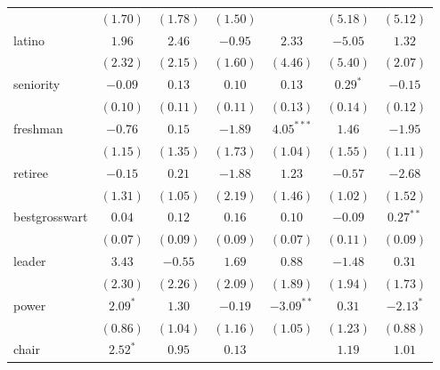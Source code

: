 \documentclass[12pt]{article}
\begin{document}
\begin{table}
\begin{center}
\begin{tabular}{l c c c c c c }
            & $(1.70)$     & $(1.78)$      & $(1.50)$       &              & $(5.18)$       & $(5.12)$      \\
            latino                 & $1.96$       & $2.46$        & $-0.95$        & $2.33$       & $-5.05$        & $1.32$        \\
            & $(2.32)$     & $(2.15)$      & $(1.60)$       & $(4.46)$     & $(5.40)$       & $(2.07)$      \\
            seniority              & $-0.09$      & $0.13$        & $0.10$         & $0.13$       & $0.29^{*}$     & $-0.15$       \\
            & $(0.10)$     & $(0.11)$      & $(0.11)$       & $(0.13)$     & $(0.14)$       & $(0.12)$      \\
            freshman               & $-0.76$      & $0.15$        & $-1.89$        & $4.05^{***}$ & $1.46$         & $-1.95$       \\
            & $(1.15)$     & $(1.35)$      & $(1.73)$       & $(1.04)$     & $(1.55)$       & $(1.11)$      \\
            retiree                & $-0.15$      & $0.21$        & $-1.88$        & $1.23$       & $-0.57$        & $-2.68$       \\
            & $(1.31)$     & $(1.05)$      & $(2.19)$       & $(1.46)$     & $(1.02)$       & $(1.52)$      \\
            bestgrosswart          & $0.04$       & $0.12$        & $0.16$         & $0.10$       & $-0.09$        & $0.27^{**}$   \\
            & $(0.07)$     & $(0.09)$      & $(0.09)$       & $(0.07)$     & $(0.11)$       & $(0.09)$      \\
            leader                 & $3.43$       & $-0.55$       & $1.69$         & $0.88$       & $-1.48$        & $0.31$        \\
            & $(2.30)$     & $(2.26)$      & $(2.09)$       & $(1.89)$     & $(1.94)$       & $(1.73)$      \\
            power                  & $2.09^{*}$   & $1.30$        & $-0.19$        & $-3.09^{**}$ & $0.31$         & $-2.13^{*}$   \\
            & $(0.86)$     & $(1.04)$      & $(1.16)$       & $(1.05)$     & $(1.23)$       & $(0.88)$      \\
            chair                  & $2.52^{*}$   & $0.95$        & $0.13$         &              & $1.19$         & $1.01$        \\

\end{tabular}
\end{center}
\end{table}
\end{document}
